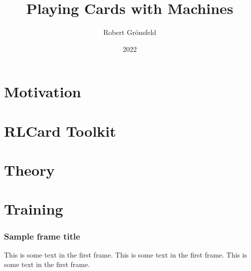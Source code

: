 \documentclass{beamer}
\title{Playing Cards with Machines}
\author{Robert Grönsfeld}
\institute{Baloise}
\date{2022}
\begin{document}
\section{Motivation}
\section{RLCard Toolkit}
\section{Theory}
\section{Training}

\frame{\titlepage}

\begin{frame}
\frametitle{Sample frame title}
This is some text in the first frame. This is some text in the first frame. This is some text in the first frame.
\end{frame}
\end{document}

